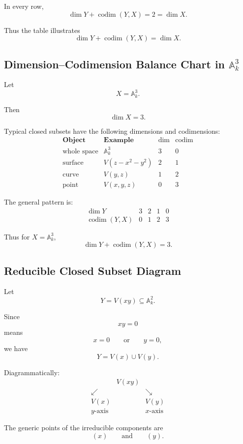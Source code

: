 \documentclass[12pt,a4paper]{article}
\theoremstyle{notespace}
\begin{document}
In every row,
\[
\dim Y+\operatorname{codim}(Y,X)=2=\dim X.
\]

Thus the table illustrates
\[
\boxed{
	\dim Y+\operatorname{codim}(Y,X)=\dim X.
}
\]

\subsection{Dimension--Codimension Balance Chart in \(\mathbb A^3_k\)}

Let
\[
X=\mathbb A^3_k.
\]

Then
\[
\dim X=3.
\]

Typical closed subsets have the following dimensions and codimensions:
\[
\begin{array}{c|c|c|c}
	\textbf{Object}
	&
	\textbf{Example}
	&
	\dim
	&
	\operatorname{codim}
	\\
	\hline
	\text{whole space}
	&
	\mathbb A^3_k
	&
	3
	&
	0
	\\
	\text{surface}
	&
	V(z-x^2-y^2)
	&
	2
	&
	1
	\\
	\text{curve}
	&
	V(y,z)
	&
	1
	&
	2
	\\
	\text{point}
	&
	V(x,y,z)
	&
	0
	&
	3
\end{array}
\]

The general pattern is:
\[
\begin{array}{c|cccc}
	\dim Y
	&
	3
	&
	2
	&
	1
	&
	0
	\\
	\hline
	\operatorname{codim}(Y,X)
	&
	0
	&
	1
	&
	2
	&
	3
\end{array}
\]

Thus for \(X=\mathbb A^3_k\),
\[
\dim Y+\operatorname{codim}(Y,X)=3.
\]

\subsection{Reducible Closed Subset Diagram}

Let
\[
Y=V(xy)\subseteq \mathbb A^2_k.
\]

Since
\[
xy=0
\]
means
\[
x=0
\qquad\text{or}\qquad
y=0,
\]
we have
\[
Y=V(x)\cup V(y).
\]

Diagrammatically:
\[
\begin{array}{ccc}
	& V(xy) &
	\\[0.7em]
	\swarrow & & \searrow
	\\[0.7em]
	V(x) & & V(y)
	\\[0.4em]
	y\text{-axis} & & x\text{-axis}
\end{array}
\]

The generic points of the irreducible components are
\[
(x)
\qquad\text{and}\qquad
(y).
\]
\end{document}

